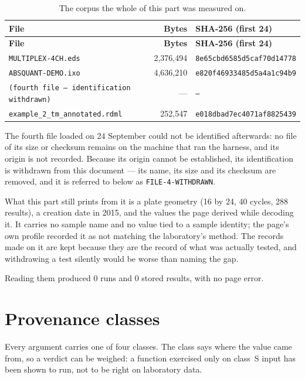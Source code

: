 {\small
\begin{xltabular}{\linewidth}{|X|r|l|}
\caption{The corpus the whole of this part was measured on.}\label{tab:val-corpus} \\
\toprule \textbf{File} & \textbf{Bytes} & \textbf{SHA-256 (first 24)} \\\midrule\endfirsthead
\toprule \textbf{File} & \textbf{Bytes} & \textbf{SHA-256 (first 24)} \\\midrule\endhead
\texttt{MULTIPLEX-4CH.eds} & 2,376,494 & \texttt{8e65cbd6585d5caf70d14778} \\
\texttt{ABSQUANT-DEMO.ixo} & 4,636,210 & \texttt{e820f46933485d5a4a1c94b9} \\
\texttt{(fourth file --- identification withdrawn)} & --- & \texttt{---} \\
\texttt{example\_2\_tm\_annotated.rdml} & 252,547 & \texttt{e018dbad7ec4071af8825439} \\
\bottomrule
\end{xltabular}}


\begin{notebox}[title={\textbf{One corpus file was withdrawn, 28 September 2026}}]
The fourth file loaded on 24 September could not be identified afterwards: no file of its size or
checksum remains on the machine that ran the harness, and its origin is not recorded. Because its
origin cannot be established, its identification is withdrawn from this document --- its name, its
size and its checksum are removed, and it is referred to below as \texttt{FILE-4-WITHDRAWN}.

What this part still prints from it is a plate geometry (16 by 24, 40 cycles, 288 results), a
creation date in 2015, and the values the page derived while decoding it. It carries no sample name
and no value tied to a sample identity; the page's own profile recorded it as not matching the
laboratory's method. The records made on it are kept because they are the record of what was
actually tested, and withdrawing a test silently would be worse than naming the gap.
\end{notebox}

Reading them produced 0 runs and 0 stored results, with no page error.

\section{Provenance classes}
Every argument carries one of four classes. The class says where the value came
from, so a verdict can be weighed: a function exercised only on class~S input has
been shown to run, not to be right on laboratory data.


